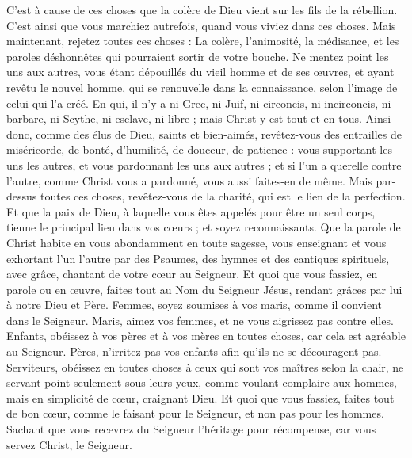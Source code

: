 \begin{multicols}{2}
C'est à cause de ces choses que la colère de Dieu vient sur les fils de la rébellion.
C'est ainsi que vous marchiez autrefois, quand vous viviez dans ces choses.
Mais maintenant, rejetez toutes ces choses : La colère, l'animosité, la médisance, et les paroles déshonnêtes qui pourraient sortir de votre bouche.
Ne mentez point les uns aux autres, vous étant dépouillés du vieil homme et de ses œuvres,
et ayant revêtu le nouvel homme, qui se renouvelle dans la connaissance, selon l'image de celui qui l'a créé.
En qui, il n'y a ni Grec, ni Juif, ni circoncis, ni incirconcis, ni barbare, ni Scythe, ni esclave, ni libre ; mais Christ y est tout et en tous.
Ainsi donc, comme des élus de Dieu, saints et bien-aimés, revêtez-vous des entrailles de miséricorde, de bonté, d'humilité, de douceur, de patience :
vous supportant les uns les autres, et vous pardonnant les uns aux autres ; et si l'un a querelle contre l'autre, comme Christ vous a pardonné, vous aussi faites-en de même.
Mais par-dessus toutes ces choses, revêtez-vous de la charité, qui est le lien de la perfection.
Et que la paix de Dieu, à laquelle vous êtes appelés pour être un seul corps, tienne le principal lieu dans vos cœurs ; et soyez reconnaissants.
Que la parole de Christ habite en vous abondamment en toute sagesse, vous enseignant et vous exhortant l'un l'autre par des Psaumes, des hymnes et des cantiques spirituels, avec grâce, chantant de votre cœur au Seigneur.
Et quoi que vous fassiez, en parole ou en œuvre, faites tout au Nom du Seigneur Jésus, rendant grâces par lui à notre Dieu et Père.
Femmes, soyez soumises à vos maris, comme il convient dans le Seigneur.
Maris, aimez vos femmes, et ne vous aigrissez pas contre elles.
Enfants, obéissez à vos pères et à vos mères en toutes choses, car cela est agréable au Seigneur.
Pères, n'irritez pas vos enfants afin qu'ils ne se découragent pas.
Serviteurs, obéissez en toutes choses à ceux qui sont vos maîtres selon la chair, ne servant point seulement sous leurs yeux, comme voulant complaire aux hommes, mais en simplicité de cœur, craignant Dieu.
Et quoi que vous fassiez, faites tout de bon cœur, comme le faisant pour le Seigneur, et non pas pour les hommes.
Sachant que vous recevrez du Seigneur l'héritage pour récompense, car vous servez Christ, le Seigneur.

\end{multicols}
